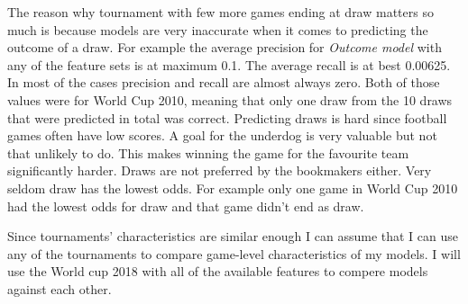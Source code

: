 The reason why tournament with few more games ending at draw matters so much is because models are very inaccurate when it comes to predicting the outcome of a draw. For example the average precision for \textit{Outcome model} with any of the feature sets is at maximum 0.1. The average recall is at best 0.00625. In most of the cases precision and recall are almost always zero. Both of those values were for World Cup 2010, meaning that only one draw from the 10 draws that were predicted in total was correct. Predicting draws is hard since football games often have low scores. A goal for the underdog is very valuable but not that unlikely to do. This makes winning the game for the favourite team significantly harder. Draws are not preferred by the bookmakers either. Very seldom draw has the lowest odds. For example only one game in World Cup 2010 had the lowest odds for draw and that game didn't end as draw.

Since tournaments' characteristics are similar enough I can assume that I can use any of the tournaments to compare game-level characteristics of my models. I will use the World cup 2018 with all of the available features to compere models against each other.

